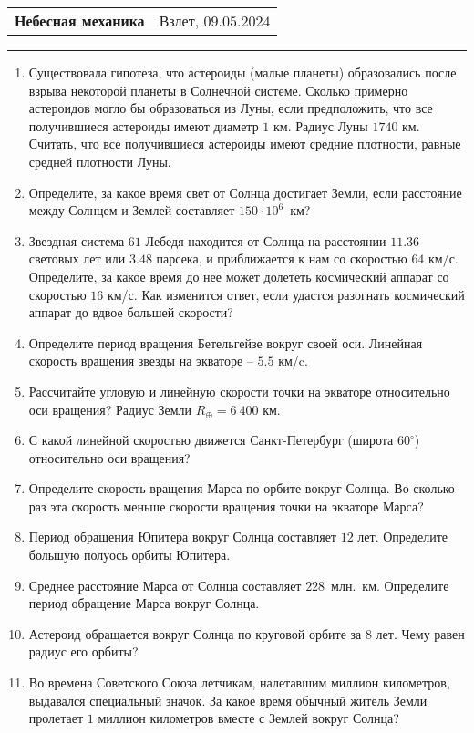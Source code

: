 \documentclass[12pt]{article}
\begin{document}
\begin{tabularx}{\textwidth}{Xr}
{\Large \textbf{Небесная механика}} & Взлет, $09.05.2024$ \\
\end{tabularx}
\noindent\rule{\textwidth}{0.4pt}
\begin{enumerate}
    \item Существовала гипотеза, что астероиды (малые планеты) образовались после взрыва некоторой планеты в Солнечной системе. Сколько примерно астероидов могло бы образоваться из Луны, если предположить, что все получившиеся астероиды имеют диаметр $1$ км. Радиус Луны $1740$ км. Считать, что все получившиеся астероиды имеют средние плотности, равные средней плотности Луны. %
    \item Определите, за какое время свет от Солнца достигает Земли, если расстояние между Солнцем и Землей составляет $150\cdot10^6$~км?
    \item Звездная система $61$ Лебедя находится от Солнца на расстоянии $11.36$ световых лет или $3.48$ парсека, и приближается к нам со скоростью $64$ км/с. Определите, за какое время до нее может долететь космический аппарат со скоростью $16$ км/с. Как изменится ответ, если удастся разогнать космический аппарат до вдвое большей скорости?
    \item Определите период вращения Бетельгейзе вокруг своей оси. Линейная скорость вращения звезды на экваторе -- $5.5$ км/c. %
    \item Рассчитайте угловую и линейную скорости точки на экваторе относительно оси вращения? Радиус Земли $R_{\oplus}=6~400$ км. 
    \item С какой линейной скоростью движется Санкт-Петербург (широта $60^{\circ}$) относительно оси вращения?
    \item Определите скорость вращения Марса по орбите вокруг Солнца. Во сколько раз эта скорость меньше скорости вращения точки на экваторе Марса? %
    \item Период обращения Юпитера вокруг Солнца составляет $12$ лет. Определите большую полуось орбиты Юпитера.
    \item Среднее расстояние Марса от Солнца составляет $228$~млн.~км. Определите период обращение Марса вокруг Солнца.
    \item Астероид обращается вокруг Солнца по круговой орбите за $8$ лет. Чему равен радиус его орбиты?
    \item Во времена Советского Союза летчикам, налетавшим миллион километров, выдавался специальный значок. За какое время обычный житель Земли пролетает $1$ миллион километров вместе с Землей вокруг Солнца?

\end{enumerate}
\end{document}
